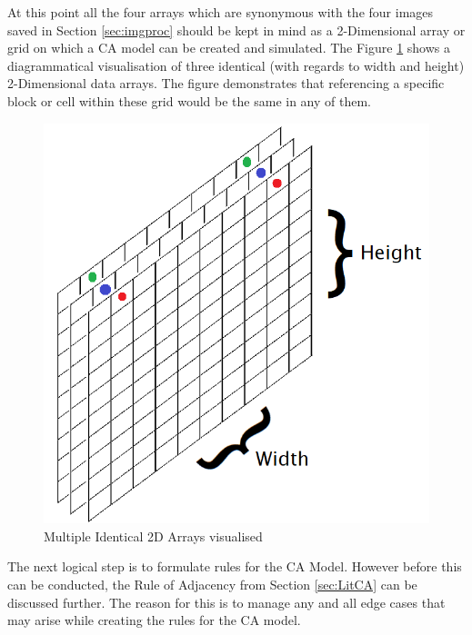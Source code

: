 At this point all the four arrays which are synonymous with the four images saved in Section \ref{sec:imgproc} should be kept in mind as a 2-Dimensional array or grid on which a CA model can be created and simulated. The Figure \ref{fig:gridlayers} shows a diagrammatical visualisation of three identical (with regards to width and height) 2-Dimensional data arrays. The figure demonstrates that referencing a specific block or cell within these grid would be the same in any of them.
\begin{figure}[H]
\centering
\includegraphics[scale=0.6]{Figures/Chapter3/gridlayers}
\caption{Multiple Identical 2D Arrays visualised}
\label{fig:gridlayers}
\end{figure}
The next logical step is to formulate rules for the CA Model. However before this can be conducted, the Rule of Adjacency from Section \ref{sec:LitCA} can be discussed further. The reason for this is to manage any and all edge cases that may arise while creating the rules for the CA model.

